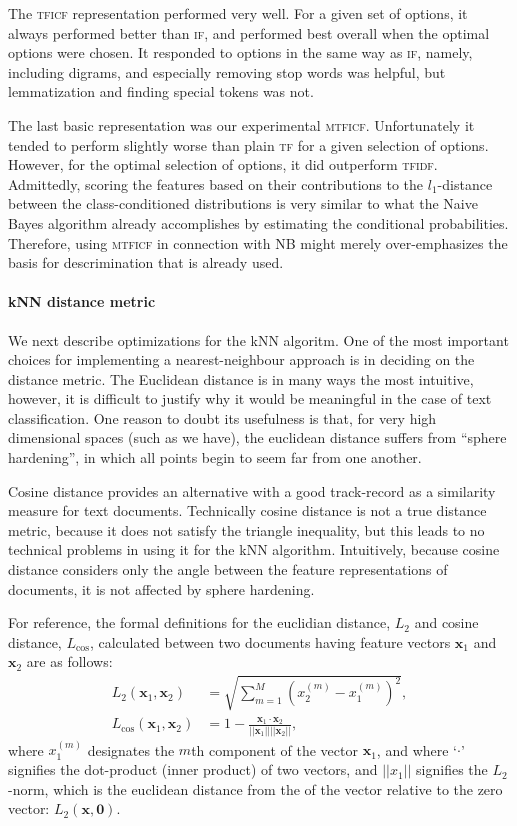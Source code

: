 \documentclass[conference,letterpaper]{IEEEtran}
\begin{document}
The \textsc{tficf} representation performed very well.  For a given set of 
options, it always performed better than \textsc{if}, and performed best 
overall when the optimal options were chosen.  It responded to options in the 
same
way as \textsc{if}, namely, including digrams, and especially removing stop
words was helpful, but lemmatization and finding special tokens was not.

The last basic representation was our experimental \textsc{mtficf}.  
Unfortunately it tended to perform slightly worse than plain \textsc{tf} for
a given selection of options.  However, for the optimal selection of options,
it did outperform \textsc{tfidf}.  Admittedly, scoring the 
features based on their contributions to the $l_1$-distance between the 
class-conditioned distributions is very similar to what the Naive Bayes 
algorithm already accomplishes by estimating the conditional probabilities.
Therefore, using \textsc{mtficf} in connection with NB might merely 
over-emphasizes the basis for descrimination that is already used.


\paragraph*{kNN distance metric}
We next describe optimizations for the kNN algoritm.  One of the most important
choices for implementing a nearest-neighbour approach is in deciding
on the distance metric.  The Euclidean distance is in many ways
the most intuitive, however, it is difficult to justify why it would be
meaningful in the case of text classification.  One reason to doubt its 
usefulness is that, for very high dimensional spaces (such as we have), 
the euclidean distance suffers from ``sphere hardening'', in which all points
begin to seem far from one another.

Cosine distance provides an alternative with a good track-record as a 
similarity measure for text documents.  Technically cosine distance is not
a true distance metric, because it does not satisfy the triangle inequality,
but this leads to no technical problems in using it for the kNN algorithm.
Intuitively, because cosine distance considers only the angle between 
the feature representations of documents, it is not affected by sphere 
hardening.  

For reference, the formal definitions for the euclidian distance, $L_2$ and
cosine distance, $L_\mathrm{cos}$, calculated between two documents having 
feature vectors $\mathbf{x}_1$ and $\mathbf{x}_2$ are as follows:
\begin{align}
	L_2(\mathbf{x}_1, \mathbf{x}_2) 
		&= \sqrt{\sum_{m=1}^M (x_2^{(m)} - x_1^{(m)})^2}, \\
	L_\mathrm{cos}(\mathbf{x}_1, \mathbf{x}_2) 
		&= 1 - \frac{\mathbf{x}_1 \cdot \mathbf{x}_2}
			{||\mathbf{x}_1|| ||\mathbf{x}_2||},
\end{align}
where $x_1^{(m)}$ designates the $m$th component of the vector $\mathbf{x}_1$,
and where `$\cdot$' signifies the dot-product (inner product) of two vectors,
and $||x_1||$ signifies the $L_2$-norm, which is the euclidean distance from
the of the vector relative to the zero vector: $L_2(\mathbf{x}, \mathbf{0})$.
\end{document}
